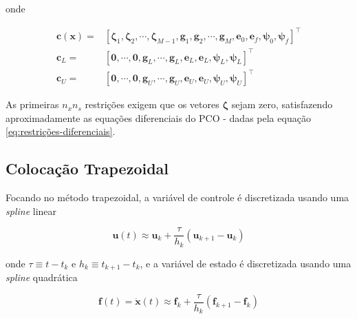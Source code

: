 \noindent onde

\begin{equation}
\begin{aligned}
    \mathbf{c}(\mathbf{x}) =& \left[ \boldsymbol{\zeta}_1, \boldsymbol{\zeta}_2, \cdots, \boldsymbol{\zeta}_{M-1}, \mathbf{g}_1, \mathbf{g}_2, \cdots, \mathbf{g}_{M}, \mathbf{e}_0, \mathbf{e}_f, \boldsymbol{\psi}_0, \boldsymbol{\psi}_f \right]^\intercal \\
    \mathbf{c}_L =& \left[ \mathbf{0}, \cdots, \mathbf{0}, \mathbf{g}_L, \cdots, \mathbf{g}_L, \mathbf{e}_L, \mathbf{e}_L, \boldsymbol{\psi}_L, \boldsymbol{\psi}_L \right]^\intercal \\
    \mathbf{c}_U =& \left[ \mathbf{0}, \cdots, \mathbf{0}, \mathbf{g}_U, \cdots, \mathbf{g}_U, \mathbf{e}_U, \mathbf{e}_U, \boldsymbol{\psi}_U, \boldsymbol{\psi}_U \right]^\intercal
\end{aligned}
\end{equation}

As primeiras $n_x n_s$ restrições exigem que os vetores $\boldsymbol{\zeta}$ sejam zero, satisfazendo aproximadamente as equações diferenciais do PCO - dadas pela equação \ref{eq:restrições-diferenciais}.


\subsection{Colocação Trapezoidal}

Focando no método trapezoidal, a variável de controle é discretizada usando uma \textit{spline} linear 

\begin{equation}
    \mathbf{u}(t) \approx \mathbf{u}_k + \dfrac{\tau}{h_k} (\mathbf{u}_{k+1} - \mathbf{u}_k)
\end{equation}

\noindent onde $\tau \equiv t - t_k$ e $h_k \equiv t_{k+1} - t_k$, e a variável de estado é discretizada usando uma \textit{spline} quadrática

\begin{equation}
    \mathbf{f}(t) = \dot{\mathbf{x}}(t) \approx \mathbf{f}_k + \dfrac{\tau}{h_k} (\mathbf{f}_{k+1} - \mathbf{f}_k)
\end{equation}

